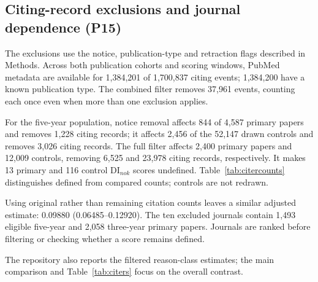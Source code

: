 \subsection{Citing-record exclusions and journal dependence (P15)}
The exclusions use the notice, publication-type and retraction flags described in Methods.
Across both publication cohorts and scoring windows, PubMed metadata are available for 1,384,201 of
1,700,837 citing events; 1,384,200 have a known publication type. The combined filter removes 37,961 events,
counting each once even when more than one exclusion applies.

For the five-year population, notice removal affects 844 of 4,587 primary papers and removes 1,228 citing records;
it affects 2,456 of the 52,147 drawn controls and removes 3,026 citing records. The full filter affects 2,400 primary
papers and 12,009 controls, removing 6,525 and 23,978 citing records, respectively.
It makes 13 primary and 116 control DI$_{nok}$ scores undefined. Table~\ref{tab:citercounts} distinguishes
defined from compared counts; controls are not redrawn.

Using original rather than remaining citation counts leaves a similar adjusted estimate:
0.09880 (0.06485--0.12920). The ten excluded journals contain 1,493 eligible five-year and 2,058 three-year
primary papers. Journals are ranked before filtering or checking whether a score remains defined.

The repository also reports the filtered reason-class estimates; the main comparison and Table~\ref{tab:citers}
focus on the overall contrast.

